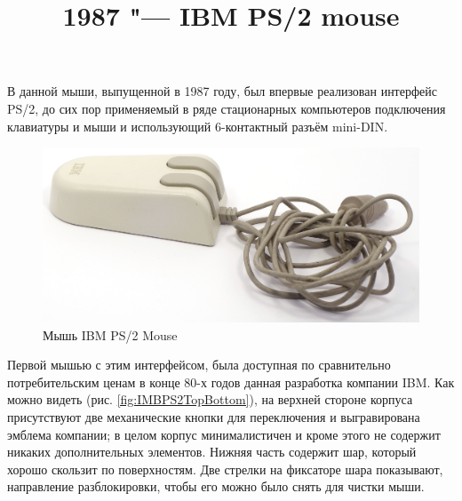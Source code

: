 \documentclass[11pt, a4paper]{article}
\begin{document}
\title{1987 "--- IBM PS/2 mouse}
\date{}
\maketitle
{}
В данной мыши, выпущенной в 1987 году, был впервые реализован интерфейс PS/2, до сих пор применяемый в ряде стационарных компьютеров подключения клавиатуры и мыши и использующий 6-контактный разъём mini-DIN.

\begin{figure}[h]
    \centering
    \includegraphics[scale=0.6]{1987_ibm_ps2_mouse/num0.JPG}
    \caption{Мышь IBM PS/2 Mouse}
    \label{fig:IMBPS2Pic}
\end{figure}

Первой мышью с этим интерфейсом, была доступная по сравнительно потребительским ценам в конце 80-х годов данная разработка компании IBM. Как можно видеть (рис. \ref{fig:IMBPS2TopBottom}), на верхней стороне корпуса присутствуют две механические кнопки для переключения и выгравирована эмблема компании; в целом корпус минималистичен и кроме этого не содержит никаких дополнительных элементов. Нижняя часть содержит шар, который хорошо скользит по поверхностям. Две стрелки на фиксаторе шара показывают, направление разблокировки, чтобы его можно было снять для чистки мыши.
\end{document}

